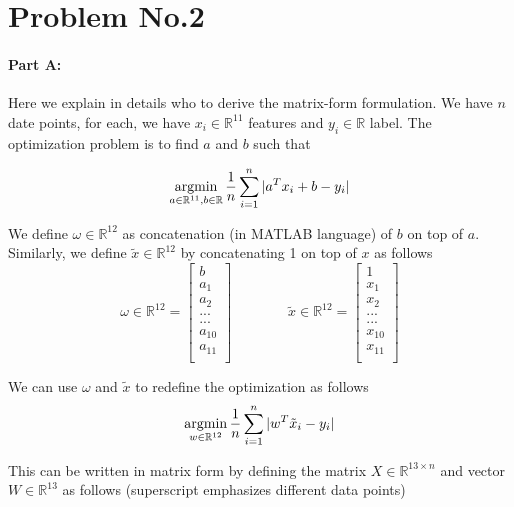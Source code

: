 \section*{Problem No.2} \label{sec:prob2}



\paragraph{Part A:}
Here we explain in details who to derive the matrix-form formulation. We have $n$ date points, for each, we have $x_{i} \in \mathbb{R}^{11}$ features and $y_{i}\in \mathbb{R}$ label. The optimization problem is to find $a$  and $b$ such that 

$$
\operatorname*{argmin}_{a\in \mathbb{R}^{11}, b\in \mathbb{R}} \frac{1}{n} \sum_{i=1}^{n}|a^{T}x_{i}+b - y_{i}|
$$

We define $\omega \in \mathbb{R}^{12}$ as concatenation (in MATLAB language) of $b$ on top of $a$. Similarly, we define  $\tilde{x} \in \mathbb{R}^{12}$  by concatenating 1 on top of $x$ as follows
\[
\omega \in \mathbb{R}^{12} =
\left[
\begin{array}{c}
b \\
a_{1} \\
a_{2} \\
...\\
...\\
a_{10} \\
a_{11} \\
\end{array} 
\right]
\qquad \qquad
\tilde{x} \in \mathbb{R}^{12} =
\left[
\begin{array}{c}
1 \\
x_{1} \\
x_{2} \\
...\\
...\\
x_{10} \\
x_{11} \\
\end{array} 
\right]
\]

We can use $\omega$ and $\tilde{x}$ to redefine the optimization as follows
\[
\operatorname*{argmin}_{w\in \mathbb{R}^{12}} \frac{1}{n} \sum_{i=1}^{n}|w^{T}\tilde{x}_{i} - y_{i}|
\]

This can be written in matrix form by defining the matrix $X\in \mathbb{R}^{13 \times n}$ and vector $W \in \mathbb{R}^{13}$ as follows (superscript emphasizes different data points)

